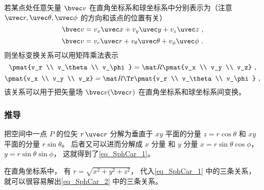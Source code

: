 若某点处任意矢量 $\bvec v$ 在直角坐标系和球坐标系中分别表示为（注意 $\uvec r, \uvec \theta, \uvec \phi$ 的方向和该点的位置有关）
\begin{equation}\label{eq_SphCar_7}
\bvec v = v_x \uvec x + v_y \uvec y + v_z \uvec z~,
\end{equation}
\begin{equation}\label{eq_SphCar_6}
\bvec v = v_r \uvec r + v_\theta \uvec \theta + v_\phi \uvec \phi~.
\end{equation}
则坐标变换关系可以用矩阵乘法表示
\begin{equation}\label{eq_SphCar_9}
\pmat{v_r \\ v_\theta \\ v_\phi}
= \mat R \pmat{v_x \\ v_y \\ v_z}~,
\end{equation}
\begin{equation}\label{eq_SphCar_8}
\pmat{v_x \\ v_y \\ v_z}
= \mat R\Tr \pmat{v_r \\ v_\theta \\ v_\phi}~,
\end{equation}
该关系可以用于把矢量场 $\bvec v(\bvec r)$ 在直角坐标系和球坐标系间变换。

\subsubsection{推导}
把空间中一点 $P$ 的位矢 $r \,\uvec r$ 分解为垂直于 $xy$ 平面的分量 $z = r\cos \theta $ 和 $xy$ 平面的分量 $r\sin \theta $。 后者又可以进而分解成 $x$ 分量 和 $y$ 分量  $x = r\sin \theta \cos \phi$，  $y = r\sin \theta \sin \phi$， 这就得到了\autoref{eq_SphCar_1}。

在直角坐标系中， 有 $r = \sqrt {x^2 + y^2 + z^2}$， 代入\autoref{eq_SphCar_1} 中的三条关系，就可以很容易解出\autoref{eq_SphCar_2} 中的三条关系。

